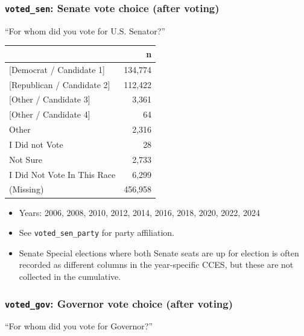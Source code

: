 \documentclass[10pt,article,oneside]{memoir}
\begin{document}
\subsubsection{\texorpdfstring{\texttt{voted\_sen}: Senate vote choice
(after
voting)}{voted\_sen: Senate vote choice (after voting)}}\label{voted_sen-senate-vote-choice-after-voting}

``For whom did you vote for U.S. Senator?''

\begin{table}[H]
\centering
\begin{tabular}[t]{lr}
\toprule
 & n\\
\midrule
{}{[Democrat / Candidate 1]} & 134,774\\
{}{[Republican / Candidate 2]} & 112,422\\
{}{[Other / Candidate 3]} & 3,361\\
{}{[Other / Candidate 4]} & 64\\
Other & 2,316\\
I Did not Vote & 28\\
Not Sure & 2,733\\
I Did Not Vote In This Race & 6,299\\
(Missing) & 456,958\\
\bottomrule
\end{tabular}
\end{table}

\begin{itemize}
\tightlist
\item
  Years: 2006, 2008, 2010, 2012, 2014, 2016, 2018, 2020, 2022, 2024
\item
  See \texttt{voted\_sen\_party} for party affiliation.
\item
  Senate Special elections where both Senate seats are up for election
  is often recorded as different columns in the year-specific CCES, but
  these are not collected in the cumulative.
\end{itemize}

\subsubsection{\texorpdfstring{\texttt{voted\_gov}: Governor vote choice
(after
voting)}{voted\_gov: Governor vote choice (after voting)}}\label{voted_gov-governor-vote-choice-after-voting}

``For whom did you vote for Governor?''
\end{document}
